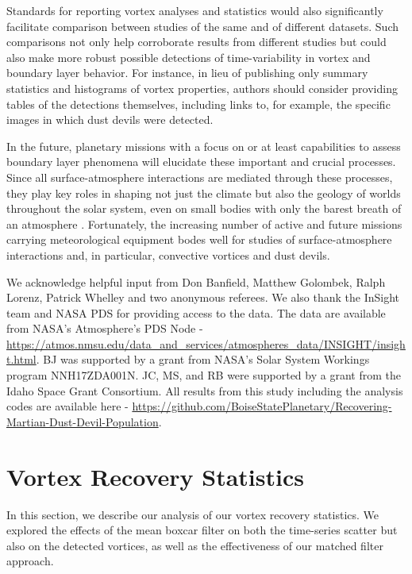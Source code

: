 \documentclass{aastex63}
\begin{document}
Standards for reporting vortex analyses and statistics would also significantly facilitate comparison between studies of the same and of different datasets. Such comparisons not only help corroborate results from different studies but could also make more robust possible detections of time-variability in vortex and boundary layer behavior. For instance, in lieu of publishing only summary statistics and histograms of vortex properties, authors should consider providing tables of the detections themselves, including links to, for example, the specific images in which dust devils were detected.

In the future, planetary missions with a focus on or at least capabilities to assess boundary layer phenomena will elucidate these important and crucial processes. Since all surface-atmosphere interactions are mediated through these processes, they play key roles in shaping not just the climate but also the geology of worlds throughout the solar system, even on small bodies with only the barest breath of an atmosphere \citep{2017PNAS..114.2509J}. Fortunately, the increasing number of active and future missions carrying meteorological equipment bodes well for studies of surface-atmosphere interactions and, in particular, convective vortices and dust devils. 

\acknowledgments

We acknowledge helpful input from Don Banfield, Matthew Golombek, Ralph Lorenz, Patrick Whelley and two anonymous referees. We also thank the InSight team and NASA PDS for providing access to the data. The data are available from NASA's Atmosphere's PDS Node - \url{https://atmos.nmsu.edu/data_and_services/atmospheres_data/INSIGHT/insight.html}. BJ was supported by a grant from NASA's Solar System Workings program NNH17ZDA001N. JC, MS, and RB were supported by a grant from the Idaho Space Grant Consortium. All results from this study including the analysis codes are available here - \url{https://github.com/BoiseStatePlanetary/Recovering-Martian-Dust-Devil-Population}.

\vspace{5mm}


\appendix

\section{Vortex Recovery Statistics}
\label{sec:Vortex Recovery Statistics}
In this section, we describe our analysis of our vortex recovery statistics. We explored the effects of the mean boxcar filter on both the time-series scatter but also on the detected vortices, as well as the effectiveness of our matched filter approach.
\end{document}
